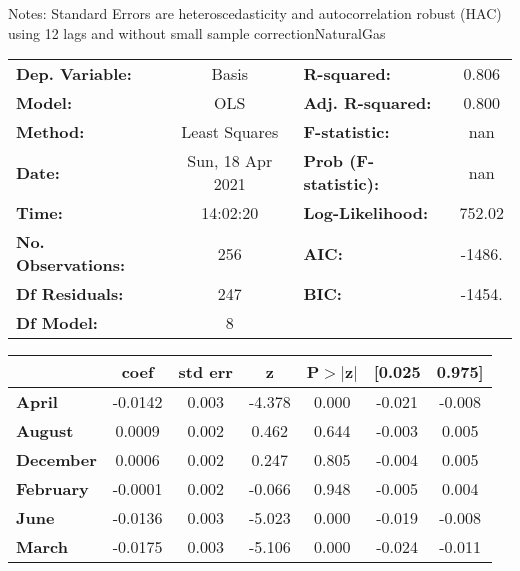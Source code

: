 Notes: \newline
 [1] Standard Errors are heteroscedasticity and autocorrelation robust (HAC) using 12 lags and without small sample correctionNaturalGas\begin{center}
\begin{tabular}{lclc}
\toprule
\textbf{Dep. Variable:}    &      Basis       & \textbf{  R-squared:         } &     0.806   \\
\textbf{Model:}            &       OLS        & \textbf{  Adj. R-squared:    } &     0.800   \\
\textbf{Method:}           &  Least Squares   & \textbf{  F-statistic:       } &       nan   \\
\textbf{Date:}             & Sun, 18 Apr 2021 & \textbf{  Prob (F-statistic):} &      nan    \\
\textbf{Time:}             &     14:02:20     & \textbf{  Log-Likelihood:    } &    752.02   \\
\textbf{No. Observations:} &         256      & \textbf{  AIC:               } &    -1486.   \\
\textbf{Df Residuals:}     &         247      & \textbf{  BIC:               } &    -1454.   \\
\textbf{Df Model:}         &           8      & \textbf{                     } &             \\
\bottomrule
\end{tabular}
\begin{tabular}{lcccccc}
                  & \textbf{coef} & \textbf{std err} & \textbf{z} & \textbf{P$> |$z$|$} & \textbf{[0.025} & \textbf{0.975]}  \\
\midrule
\textbf{April}    &      -0.0142  &        0.003     &    -4.378  &         0.000        &       -0.021    &       -0.008     \\
\textbf{August}   &       0.0009  &        0.002     &     0.462  &         0.644        &       -0.003    &        0.005     \\
\textbf{December} &       0.0006  &        0.002     &     0.247  &         0.805        &       -0.004    &        0.005     \\
\textbf{February} &      -0.0001  &        0.002     &    -0.066  &         0.948        &       -0.005    &        0.004     \\
\textbf{June}     &      -0.0136  &        0.003     &    -5.023  &         0.000        &       -0.019    &       -0.008     \\
\textbf{March}    &      -0.0175  &        0.003     &    -5.106  &         0.000        &       -0.024    &       -0.011     \\

\end{tabular}
\end{center}
